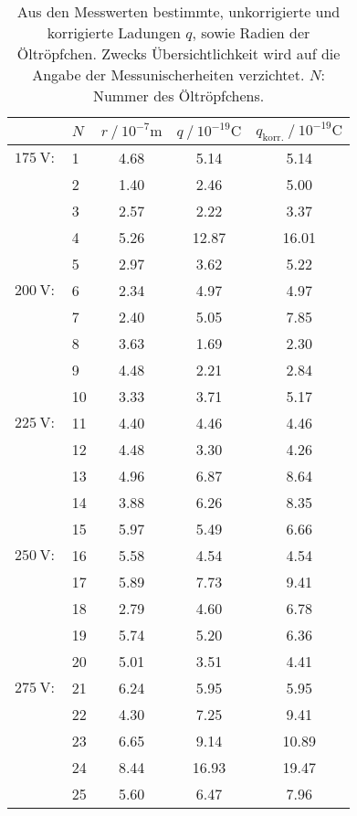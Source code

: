 \begin{table}
    \centering
    \caption{Aus den Messwerten bestimmte, unkorrigierte und korrigierte Ladungen $q$, sowie Radien der Öltröpfchen. Zwecks Übersichtlichkeit wird auf die Angabe der 
            Messunischerheiten verzichtet. $N$: Nummer des Öltröpfchens.}
    \label{tab:Ladungen}
    \begin{tabular}{c l S[table-format = 1.2] S[table-format = 2.2] S}
      \toprule
        {} & {$N$} & {$r \mathbin{/} 10^{-7} \unit{\metre}$} & {$q \mathbin{/} {10}^{-19} \unit{\coulomb}$} & {$q_\text{korr.} \mathbin{/} {10}^{-19} \unit{\coulomb}$} \\
        \midrule
        {$\qty{175}{\volt}:$} &  {1} & 4.68 &  5.14 &  5.14 \\
        {                   } &  {2} & 1.40 &  2.46 &  5.00 \\
        {                   } &  {3} & 2.57 &  2.22 &  3.37 \\
        {                   } &  {4} & 5.26 & 12.87 & 16.01 \\
        {                   } &  {5} & 2.97 &  3.62 &  5.22 \\
        {$\qty{200}{\volt}:$} &  {6} & 2.34 &  4.97 &  4.97 \\
        {                   } &  {7} & 2.40 &  5.05 &  7.85 \\
        {                   } &  {8} & 3.63 &  1.69 &  2.30 \\
        {                   } &  {9} & 4.48 &  2.21 &  2.84 \\
        {                   } & {10} & 3.33 &  3.71 &  5.17 \\
        {$\qty{225}{\volt}:$} & {11} & 4.40 &  4.46 &  4.46 \\
        {                   } & {12} & 4.48 &  3.30 &  4.26 \\
        {                   } & {13} & 4.96 &  6.87 &  8.64 \\
        {                   } & {14} & 3.88 &  6.26 &  8.35 \\
        {                   } & {15} & 5.97 &  5.49 &  6.66 \\
        {$\qty{250}{\volt}:$} & {16} & 5.58 &  4.54 &  4.54 \\
        {                   } & {17} & 5.89 &  7.73 &  9.41 \\
        {                   } & {18} & 2.79 &  4.60 &  6.78 \\
        {                   } & {19} & 5.74 &  5.20 &  6.36 \\
        {                   } & {20} & 5.01 &  3.51 &  4.41 \\
        {$\qty{275}{\volt}:$} & {21} & 6.24 &  5.95 &  5.95 \\
        {                   } & {22} & 4.30 &  7.25 &  9.41 \\
        {                   } & {23} & 6.65 &  9.14 & 10.89 \\
        {                   } & {24} & 8.44 & 16.93 & 19.47 \\
        {                   } & {25} & 5.60 &  6.47 &  7.96 \\
      \bottomrule
    \end{tabular}
  \end{table}